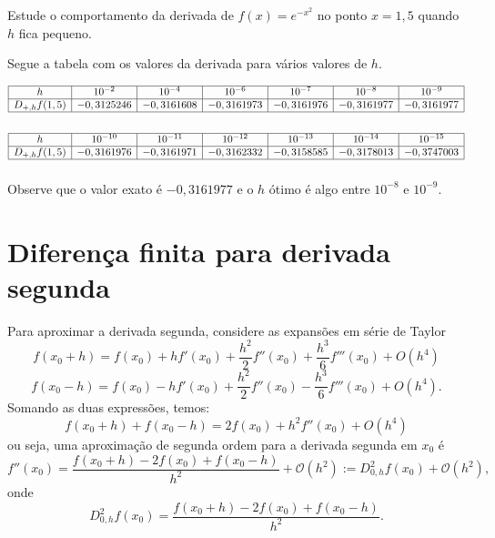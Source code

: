 \begin{exer}Estude o comportamento da derivada de $f(x)=e^{-x^2}$ no ponto $x=1,5$ quando $h$ fica pequeno.
\end{exer}
\begin{resp}
  
Segue a tabela com os valores da derivada para vários valores de $h$.

\begin{equation*}
\begin{array}{|c|c|c|c|c|c|c|}\hline
h&10^{-2}&10^{-4}&10^{-6}&10^{-7}&10^{-8}&10^{-9}\\\hline
D_{+,h}f(1,5)& - 0,3125246&- 0,3161608 &- 0,3161973&- 0,3161976&- 0,3161977&- 0,3161977 \\\hline
\multicolumn{7}{c}{}
\end{array}  
\end{equation*}  
\begin{equation*}
\begin{array}{|c|c|c|c|c|c|c|}\hline
h&10^{-10}&10^{-11}&10^{-12}&10^{-13}&10^{-14}&10^{-15}\\\hline
D_{+,h}f(1,5)&- 0,3161976&- 0,3161971&- 0,3162332&- 0,3158585&- 0,3178013&- 0,3747003\\\hline
\multicolumn{7}{c}{}
\end{array}
\end{equation*}
Observe que o valor exato é $-0,3161977$ e o $h$ ótimo é algo entre $10^{-8}$ e $10^{-9}$.        
\end{resp}

\section{Diferença finita para derivada segunda}

Para aproximar a derivada segunda, considere as expansões em série de Taylor
$$
f(x_0+h)=f(x_0)+hf'(x_0)+\frac{h^2}{2}f''(x_0)+\frac{h^3}{6}f'''(x_0)+O(h^4)
$$
$$
f(x_0-h)=f(x_0)-hf'(x_0)+\frac{h^2}{2}f''(x_0)-\frac{h^3}{6}f'''(x_0)+O(h^4).
$$
Somando as duas expressões, temos:
$$
f(x_0+h)+f(x_0-h)=2f(x_0)+h^2f''(x_0)+O(h^4)
$$
ou seja, uma aproximação de segunda ordem para a derivada segunda em $x_0$ é
$$
f''(x_0)=\frac{f(x_0+h)-2f(x_0)+f(x_0-h)}{h^2}+\mathcal{O}(h^2):=D^2_{0,h}f(x_0)+\mathcal{O}(h^2),
$$
onde
$$
D^2_{0,h}f(x_0)=\frac{f(x_0+h)-2f(x_0)+f(x_0-h)}{h^2}.
$$

